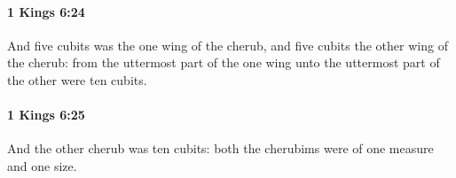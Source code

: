		\paragraph{1 Kings 6:24} %
			\label{1KINGS-6-24}

			And five cubits was the one wing of the cherub, and five cubits the other wing of the cherub: from the uttermost part of the one wing unto the uttermost part of the other were ten cubits.


		\paragraph{1 Kings 6:25} %
			\label{1KINGS-6-25}

			And the other cherub was ten cubits: both the cherubims were of one measure and one size.


